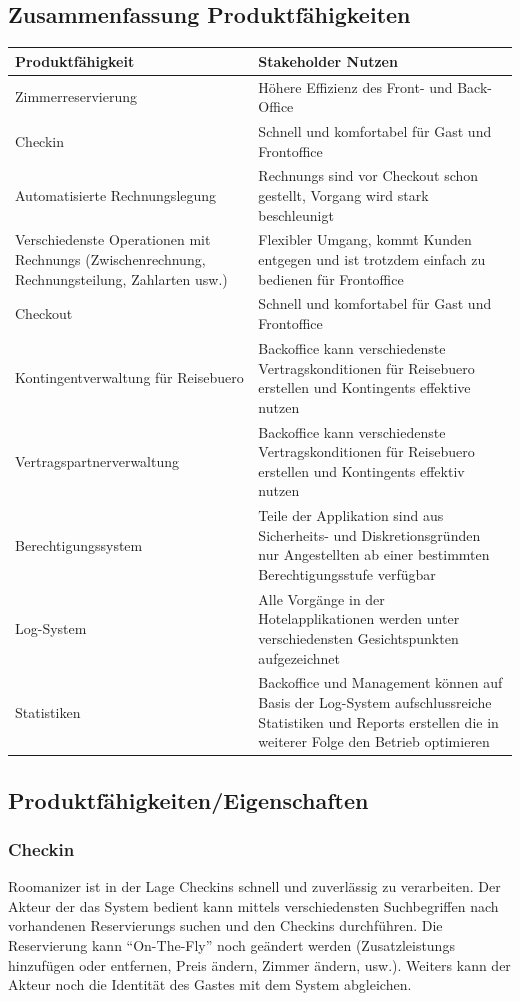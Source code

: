 \documentclass[10pt,a4paper,titlepage]{article}
\begin{document}
\subsection{Zusammenfassung Produktfähigkeiten}
\begin{tabular}{|p{5.7cm}|p{5.7cm}|}
	\hline
	\textbf{Produktfähigkeit} &
	\textbf{Stakeholder Nutzen}
	\\
	\hline
	Zimmerreservierung &
	Höhere Effizienz des Front- und Back-Office
	\\
	\hline
	\Gls{Checkin} &
	Schnell und komfortabel für \Gls{Gast} und \Gls{Frontoffice}
	\\
	\hline
	Automatisierte Rechnungslegung &
	\Glspl{Rechnung} sind vor \Gls{Checkout} schon gestellt, Vorgang wird stark beschleunigt
	\\
	\hline
	Verschiedenste Operationen mit \Glspl{Rechnung} (\Gls{Zwischenrechnung}, Rechnungsteilung, Zahlarten usw.) &
	Flexibler Umgang, kommt \Gls{Kunde}n entgegen und ist trotzdem einfach zu bedienen für \Gls{Frontoffice}
	\\
	\hline
	\Gls{Checkout} &
	Schnell und komfortabel für Gast und \Gls{Frontoffice}
	\\
	\hline
	Kontingentverwaltung für \Gls{Reisebuero} &
	\Gls{Backoffice} kann verschiedenste Vertragskonditionen für \Gls{Reisebuero} erstellen und \Glspl{Kontingent} effektive nutzen
	\\
	\hline
	Vertragspartnerverwaltung &
	\Gls{Backoffice} kann verschiedenste Vertragskonditionen für \Gls{Reisebuero} erstellen und \Glspl{Kontingent} effektiv nutzen
	\\
	\hline
	Berechtigungssystem &
	Teile der Applikation sind aus Sicherheits- und Diskretionsgründen nur Angestellten ab einer bestimmten Berechtigungsstufe verfügbar
	\\
	\hline
	Log-System &
	Alle Vorgänge in der Hotelapplikationen werden unter verschiedensten Gesichtspunkten aufgezeichnet
	\\
	\hline
	Statistiken &
	\Gls{Backoffice} und Management können auf Basis der Log-System aufschlussreiche Statistiken und \Glspl{Report} erstellen die in weiterer Folge den Betrieb optimieren
	\\
	\hline
\end{tabular}

\subsection{Produktfähigkeiten/Eigenschaften}
\subsubsection{\Gls{Checkin}}
Roomanizer ist in der Lage \Glspl{Checkin} schnell und zuverlässig zu verarbeiten. Der Akteur der das System bedient kann mittels  verschiedensten Suchbegriffen nach vorhandenen \Glspl{Reservierung} suchen und den \Glspl{Checkin} durchführen. Die \Gls{Reservierung} kann "`On-The-Fly"' noch geändert werden (\Glspl{Zusatzleistung} hinzufügen oder entfernen, Preis ändern, \Gls{Zimmer} ändern, usw.). Weiters kann der Akteur noch die Identität des \Gls{Gast}es mit dem System abgleichen.
\end{document}
